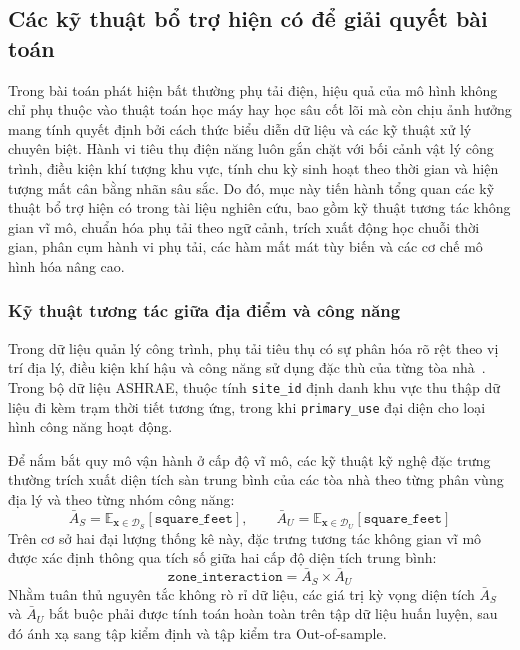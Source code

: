 \subsection{Các kỹ thuật bổ trợ hiện có để giải quyết bài toán}

Trong bài toán phát hiện bất thường phụ tải điện, hiệu quả của mô hình không chỉ phụ thuộc vào thuật toán học máy hay học sâu cốt lõi mà còn chịu ảnh hưởng mang tính quyết định bởi cách thức biểu diễn dữ liệu và các kỹ thuật xử lý chuyên biệt. Hành vi tiêu thụ điện năng luôn gắn chặt với bối cảnh vật lý công trình, điều kiện khí tượng khu vực, tính chu kỳ sinh hoạt theo thời gian và hiện tượng mất cân bằng nhãn sâu sắc. Do đó, mục này tiến hành tổng quan các kỹ thuật bổ trợ hiện có trong tài liệu nghiên cứu, bao gồm kỹ thuật tương tác không gian vĩ mô, chuẩn hóa phụ tải theo ngữ cảnh, trích xuất động học chuỗi thời gian, phân cụm hành vi phụ tải, các hàm mất mát tùy biến và các cơ chế mô hình hóa nâng cao.

\subsubsection{Kỹ thuật tương tác giữa địa điểm và công năng}

Trong dữ liệu quản lý công trình, phụ tải tiêu thụ có sự phân hóa rõ rệt theo vị trí địa lý, điều kiện khí hậu và công năng sử dụng đặc thù của từng tòa nhà~\cite{bdg2, ashrae_gep3}. Trong bộ dữ liệu ASHRAE, thuộc tính \texttt{site\_id} định danh khu vực thu thập dữ liệu đi kèm trạm thời tiết tương ứng, trong khi \texttt{primary\_use} đại diện cho loại hình công năng hoạt động.

Để nắm bắt quy mô vận hành ở cấp độ vĩ mô, các kỹ thuật kỹ nghệ đặc trưng thường trích xuất diện tích sàn trung bình của các tòa nhà theo từng phân vùng địa lý và theo từng nhóm công năng:
\begin{equation*}
    \bar{A}_{S} = \mathbb{E}_{\mathbf{x} \in \mathcal{D}_S}[\texttt{square\_feet}], \qquad \bar{A}_{U} = \mathbb{E}_{\mathbf{x} \in \mathcal{D}_U}[\texttt{square\_feet}]
\end{equation*}
Trên cơ sở hai đại lượng thống kê này, đặc trưng tương tác không gian vĩ mô được xác định thông qua tích số giữa hai cấp độ diện tích trung bình:
\begin{equation*}
    \texttt{zone\_interaction} = \bar{A}_S \times \bar{A}_U
\end{equation*}
Nhằm tuân thủ nguyên tắc không rò rỉ dữ liệu, các giá trị kỳ vọng diện tích $\bar{A}_S$ và $\bar{A}_U$ bắt buộc phải được tính toán hoàn toàn trên tập dữ liệu huấn luyện, sau đó ánh xạ sang tập kiểm định và tập kiểm tra Out-of-sample.

